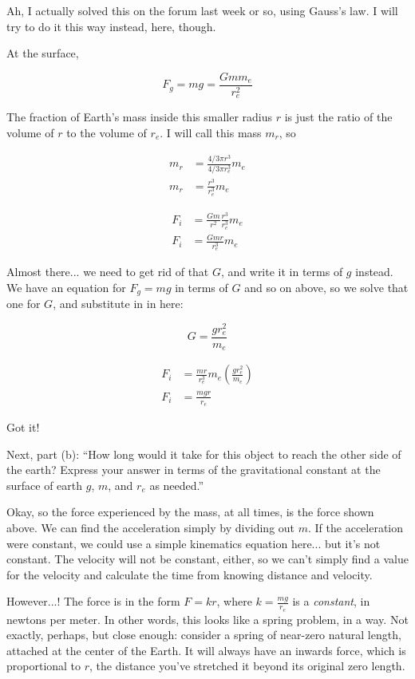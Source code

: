 \documentclass[8.01x]{subfiles}
\begin{document}
Ah, I actually solved this on the forum last week or so, using Gauss's law. I will try to do it this way instead, here, though.

At the surface,

\begin{equation}
F_g = m g = \frac{G m m_e}{r_e^2}
\end{equation}

The fraction of Earth's mass inside this smaller radius $r$ is just the ratio of the volume of $r$ to the volume of $r_e$. I will call this mass $m_r$, so

\begin{align}
m_r &= \frac{4/3 \pi r^3}{4/3 \pi r_e^3} m_e\\
m_r &= \frac{r^3}{r_e^3} m_e
\end{align}

\begin{align}
F_i &= \frac{G m}{r^2} \frac{r^3}{r_e^3} m_e\\
F_i &= \frac{G m r}{r_e^3} m_e
\end{align}

Almost there... we need to get rid of that $G$, and write it in terms of $g$ instead. We have an equation for $F_g = m g$ in terms of $G$ and so on above, so we solve that one for $G$, and substitute in in here:

\begin{equation}
G = \frac{g r_e^2}{m_e}
\end{equation}

\begin{align}
F_i &= \frac{m r}{r_e^3} m_e \left(\frac{g r_e^2}{m_e}\right)\\
F_i &= \frac{m g r}{r_e}
\end{align}

Got it!

Next, part (b): ``How long would it take for this object to reach the other side of the earth? Express your answer in terms of the gravitational constant at the surface of earth $g$, $m$, and $r_e$ as needed.''

Okay, so the force experienced by the mass, at all times, is the force shown above. We can find the acceleration simply by dividing out $m$. If the acceleration were constant, we could use a simple kinematics equation here... but it's not constant. The velocity will not be constant, either, so we can't simply find a value for the velocity and calculate the time from knowing distance and velocity.

However...! The force is in the form $F = k r$, where $k = \frac{m g}{r_e}$ is a \emph{constant}, in newtons per meter. In other words, this looks like a spring problem, in a way. Not exactly, perhaps, but close enough: consider a spring of near-zero natural length, attached at the center of the Earth. It will always have an inwards force, which is proportional to $r$, the distance you've stretched it beyond its original zero length.
\end{document}
